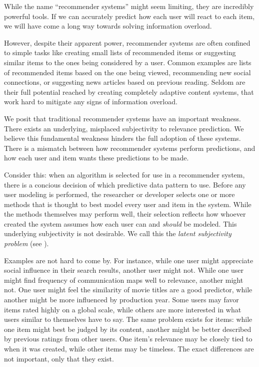 While the name ``recommender systems'' might seem limiting, they are incredibly powerful tools.
If we can accurately predict how each user will react to each item,
we will have come a long way towards solving information overload.

However, despite their apparent power, recommender systems are often confined
to simple tasks like creating small lists of recommended items
or suggesting similar items to the ones being considered by a user.
Common examples are lists of recommended items based on the one being viewed, 
recommending new social connections, or suggesting news articles based on previous reading.
Seldom are their full potential reached by creating completely adaptive
content systems, that work hard to mitigate any signs of information overload.

We posit that traditional recommender systems have an important weakness.
There exists an underlying, misplaced subjectivity to relevance prediction.
We believe this fundamental weakness hinders the full adoption of these systems.
There is a mismatch between how recommender systems perform predictions,
and how each user and item wants these predictions to be made.

Consider this: 
when an algorithm is selected for use in a recommender system,
there is a concious decision of which predictive data pattern to use.
Before any user modeling is performed, the researcher or developer selects
one or more methods that is thought to best model every user and item in the system.
While the methods themselves may perform well, their selection
reflects how whoever created the system assumes how each user
can and \emph{should} be modeled. This underlying subjectivity is not desirable.
We call this the \emph{latent subjectivity problem}
(see \cite[p33]{Bjorkoy2011}).

Examples are not hard to come by.
For instance, while one user might appreciate social
influence in their search results, another user might not.
While one user might find frequency of communication maps well to relevance,
another might not. 
One user might feel the similarity of movie titles are a good predictor,
while another might be more influenced by production year.
Some users may favor items rated highly on a global scale,
while others are more interested in what users similar to themselves have to say.
The same problem exists for items: while one item might best be judged by its content,
another might be better described by previous ratings from other users.
One item's relevance may be closely tied to when it was created,
while other items may be timeless.
The exact differences are not important, only that they exist.

